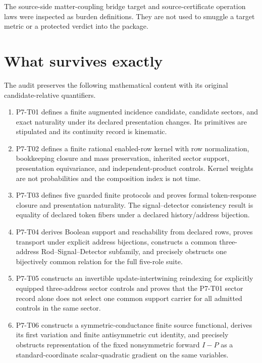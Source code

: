 \documentclass[11pt]{article}
\begin{document}
The source-side matter-coupling bridge target and source-certificate operation
laws were inspected as burden definitions. They are not used to smuggle a
target metric or a protected verdict into the package.

\section{What survives exactly}

The audit preserves the following mathematical content with its original
candidate-relative quantifiers.

\begin{enumerate}[leftmargin=*]
\item P7-T01 defines a finite augmented incidence candidate, candidate sectors,
and exact naturality under its declared presentation changes. Its primitives
are stipulated and its continuity record is kinematic.
\item P7-T02 defines a finite rational enabled-row kernel with row
normalization, bookkeeping closure and mass preservation, inherited sector
support, presentation equivariance, and independent-product controls. Kernel
weights are not probabilities and the composition index is not time.
\item P7-T03 defines five guarded finite protocols and proves formal
token-response closure and presentation naturality. The signal--detector
consistency result is equality of declared token fibers under a declared
history/address bijection.
\item P7-T04 derives Boolean support and reachability from declared rows,
proves transport under explicit address bijections, constructs a common
three-address Rod--Signal--Detector subfamily, and precisely obstructs one
bijectively common relation for the full five-role suite.
\item P7-T05 constructs an invertible update-intertwining reindexing for
explicitly equipped three-address sector controls and proves that the P7-T01
sector record alone does not select one common support carrier for all
admitted controls in the same sector.
\item P7-T06 constructs a symmetric-conductance finite source functional,
derives its first variation and finite antisymmetric cut identity, and
precisely obstructs representation of the fixed nonsymmetric forward
\(I-P\) as a standard-coordinate scalar-quadratic gradient on the same
variables.
\end{enumerate}
\end{document}
